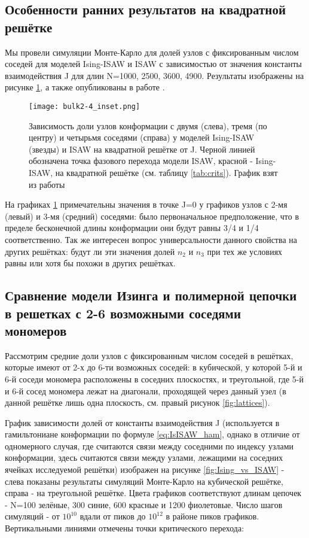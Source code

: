 \subsection{Особенности ранних результатов на квадратной решётке}

Мы провели симуляции Монте-Карло для долей узлов с фиксированным числом соседей для моделей Ising-ISAW и ISAW с зависимостью от значения константы взаимодействия J для длин N=1000, 2500, 3600, 4900. Результаты изображены на рисунке \ref{fig:Ising_vs_ISAW__2D_bulk}, а также опубликованы в работе \cite{faizullina2021critical}. 

\begin{figure}[h!]
    \centering
    \texttt{[image: bulk2-4\_inset.png]}
    \caption{Зависимость доли узлов конформации с двумя (слева), тремя (по центру) и четырьмя соседями (справа) у моделей Ising-ISAW (звезды) и ISAW на квадратной решётке от J. 
	Черной линией обозначена точка фазового перехода модели ISAW, красной - Ising-ISAW, на квадратной решётке (см. таблицу \ref{tab:crits}). 
	График взят из работы \cite{faizullina2021critical}}
    \label{fig:Ising_vs_ISAW__2D_bulk}
\end{figure}

На графиках \ref{fig:Ising_vs_ISAW__2D_bulk} примечательны значения в точке J=0 у графиков узлов с 2-мя (левый) и 3-мя (средний) соседями: было первоначальное предположение, что в пределе бесконечной длины конформации они будут равны 3/4 и 1/4 соответственно. Так же интересен вопрос универсальности данного свойства на других решётках: будут ли эти значения долей $n_{2}$ и $n_{3}$ при тех же условиях равны или хотя бы похожи в других решётках. 

\subsection{Сравнение модели Изинга и полимерной цепочки в решетках с 2-6 возможными соседями мономеров}

Рассмотрим средние доли узлов с фиксированным числом соседей в решётках, которые имеют от 2-х до 6-ти возможных соседей: в кубической, у которой 5-й и 6-й соседи мономера расположены в соседних плоскостях, и треугольной, где 5-й и 6-й сосед мономера лежат на диагонали, проходящей через данный узел (в данной решётке лишь одна плоскость, см. правый рисунок \ref{fig:lattices}).

График зависимости долей от константы взаимодействия J (используется в гамильтониане конформации по формуле \ref{eq:IsISAW_ham}, однако в отличие от одномерного случая, где считаются связи между соседними по индексу узлами конформации, здесь считаются связи между узлами, лежащими на соседних ячейках исследуемой решётки) изображен на рисунке \ref{fig:Ising_vs_ISAW} - слева показаны результаты симуляций Монте-Карло на кубической решётке, справа - на треугольной решётке. Цвета графиков соответствуют длинам цепочек - N=100 зелёные, 300 синие, 600 красные и 1200 фиолетовые. Число шагов симуляций - от $10^{10}$ вдали от пиков до $10^{12}$ в районе пиков графиков. Вертикальными линиями отмечены точки критического перехода: 

